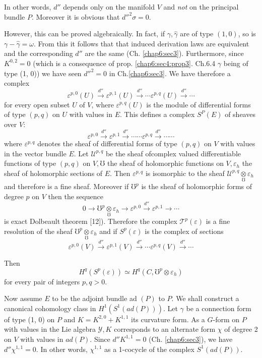 In other words, $d''$ depends only on the manifold $V$ and \textit{
  not } on the principal bundle $P$. Moreover it is obvious that
$d''^2 \sigma = 0$. 

However, this can be proved algebraically. In fact, if $\gamma,
\hat{\gamma}$ are of type $(1, 0)$, so is $\gamma - \hat{\gamma} =
\omega$. From this it follows that that induced derivation laws are
equivalent and the corresponding $d''$ are the same
(Ch. \ref{chap6:sec3}). Furthermore, since $K^{0, 2} = 0$ (which is a consequence
of prop. \ref{chap6:sec4:prop3}. Ch.6.4 $\gamma$ being of type (1,
0)) we have  seen $d''^2 = 0$ in Ch.\ref{chap6:sec3}. We have
therefore a complex  
$$
\varepsilon^{p, 0} (U) \xrightarrow{d''} \varepsilon^{p, 1} (U)
\xrightarrow{d''} \cdots \varepsilon^{p, q}(U) \xrightarrow{d''}
\cdots 
$$
for every open subset $U$ of $V$, where $\varepsilon^{p, q} (U)$ is
the module of differential forms of type $(p, q)$ on $U$ with values
in $E$. This defines a complex $S^P (E)$ of sheaves over $V$: 
$$
\varepsilon^{p, 0} \xrightarrow{d''} \varepsilon^{p, 1}
\xrightarrow{d''} \cdots \cdots \varepsilon^{p, q} \xrightarrow{d''}
\cdots \cdots 
$$
where $\varepsilon^{p, q}$ denotes the sheaf of differential forms of
type $(p, q)$ on $V$ with values in the vector bundle $E$. Let
$\mathscr{U}^{p, q}$ be the sheaf of\pageoriginale complex valued differentiable
functions of type $(p, q)$ on $V, \mho$ the sheaf of holomorphic
functions on $V, \varepsilon_h$ the sheaf of holomorphic sections of
$E$. Then $\varepsilon^{p, q}$ is isomorphic to the sheaf
$\mathscr{U}^{p, q} \underset{\mho}\otimes \varepsilon_h$ and
therefore is a fine sheaf. Moreover if $\mho^p$ is the sheaf of
holomorphic forms of degree $p$ on $V$ then the sequence 
$$
0 \to \mho^p \underset{\mho}\otimes \varepsilon_h \to \varepsilon^{p,
  0} \xrightarrow{d''} \varepsilon^{p, 1} \to \cdots 
$$
is exact Dolbeault theorem [12]). Therefore the complex
$\mathscr{T}^p(\varepsilon)$ is a fine resolution of the sheaf $\mho^p
\underset{\mho}\otimes \varepsilon_h$ and if $S^p (\varepsilon)$ is
the complex of sections 
$$
\varepsilon^{p, 0} (V) \xrightarrow{d''} \varepsilon^{p, 1} (V)
\xrightarrow{d''} \cdots \varepsilon^{p, q}(V) \xrightarrow{d''}
\cdots  
$$

Then
$$
H^q (S^p (\varepsilon)) \simeq H^q (C, \mho^p \otimes \varepsilon_h)
$$
for every pair of integers $p, q > 0$.

Now assume $E$ to be the adjoint bundle ad $(P)$ to $P$. We shall
construct a canonical cohomology class in $H^1 (S^1 (ad(P)))$. Let
$\gamma$ be a connection form of type (1, 0) on $P$ and $K = K^{2,0}
+ K^{1,1}$ its curvature form. As a $G$-form on $P$ with values in the
Lie algebra $\mathscr{Y}, K$ corresponds to an alternate form $\chi$
of degree 2 on $V$ with values in $ad(P)$. Since $d'' K^{1,1} = 0$ 
(Ch. \ref{chap6:sec3}), we have $d'' \chi ^{1,1} = 0$. In other words,
$\chi^{1,1}$ as a 1-cocycle of the complex $S^1 (ad(P))$. 

